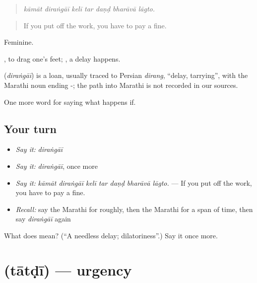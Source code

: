 \begin{quote}
\emph{kāmāt diraṅgāī kelī tar daṇḍ bharāvā lāgto.}
\end{quote}

\begin{quote}
If you put off the work, you have to pay a fine.
\end{quote}

Feminine.

 , to drag one's feet;  , a delay happens.

\begin{cousinweb}
\textbf{} (\emph{diraṅgāī}) is a loan, usually traced to Persian \emph{dirang}, \textquotedblleft{}delay, tarrying\textquotedblright{}, with the Marathi noun ending -; the path into Marathi is not recorded in our sources.
\end{cousinweb}

\begin{grammarlens}[title={What you've built}]
One more word for saying what happens if.
\end{grammarlens}

\subsection*{Your turn}
\begin{itemize}
\raggedright
  \item \emph{Say it:} \emph{diraṅgāī}
  \item \emph{Say it:} \emph{diraṅgāī}, once more
  \item \emph{Say it:} \emph{kāmāt diraṅgāī kelī tar daṇḍ bharāvā lāgto.} — If you put off the work, you have to pay a fine.
  \item \emph{Recall:} say the Marathi for roughly, then the Marathi for a span of time, then say \emph{diraṅgāī} again
\end{itemize}

\begin{tcolorbox}[breakable,colback=teal!4,colframe=teal!35!black,title={Before you move on}]
What does  mean? (\textquotedblleft{}A needless delay; dilatoriness\textquotedblright{}.) Say it once more.
\end{tcolorbox}
\section[\texorpdfstring{\mr{तातडी} (tātḍī)}{तातडी (tātḍī)}]{ (tātḍī) — urgency}

